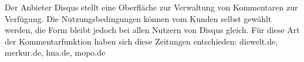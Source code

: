 Der Anbieter Disqus stellt eine Oberfläche zur Verwaltung von Kommentaren zur Verfügung. 
Die Nutzungsbedingungen können vom Kunden selbst gewählt werden, die Form bleibt jedoch 
bei allen Nutzern von Disqus gleich. Für diese Art der Kommentarfunktion haben sich diese
Zeitungen entschieden: diewelt.de, merkur.de, hna.de, mopo.de













